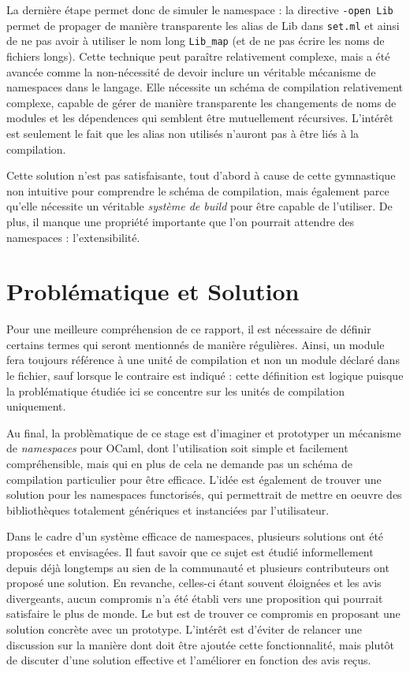 \documentclass[11pt,a4paper]{report}
\begin{document}
La dernière étape permet donc de simuler le namespace : la directive
\texttt{-open Lib} permet de propager de manière transparente les alias de Lib
dans \texttt{set.ml} et ainsi de ne pas avoir à utiliser le nom long
\texttt{Lib\_map} (et de ne pas écrire les noms de fichiers longs). Cette
technique peut paraître relativement complexe, mais a été avancée comme la
non-nécessité de devoir inclure un véritable mécanisme de namespaces dans le
langage. Elle nécessite un schéma de compilation relativement complexe, capable
de gérer de manière transparente les changements de noms de modules et les
dépendences qui semblent être mutuellement récursives. L'intérêt est seulement
le fait que les alias non utilisés n'auront pas à être liés à la compilation.

Cette solution n'est pas satisfaisante, tout d'abord à cause de cette
gymnastique non intuitive pour comprendre le schéma de compilation, mais
également parce qu'elle nécessite un véritable \emph{système de build} pour être
capable de l'utiliser. De plus, il manque une propriété importante que l'on
pourrait attendre des namespaces : l'extensibilité.

\chapter{Problématique et Solution}

Pour une meilleure compréhension de ce rapport, il est nécessaire de définir
certains termes qui seront mentionnés de manière régulières. Ainsi, un module
fera toujours référence à une unité de compilation et non un module déclaré dans
le fichier, sauf lorsque le contraire est indiqué : cette définition est logique
puisque la problématique étudiée ici se concentre sur les unités de compilation
uniquement. 


\medskip

Au final, la problèmatique de ce stage est d'imaginer et prototyper un mécanisme
de \emph{namespaces} pour OCaml, dont l'utilisation soit simple et facilement
compréhensible, mais qui en plus de cela ne demande pas un schéma de compilation
particulier pour être efficace. L'idée est également de trouver une
solution pour les namespaces functorisés, qui permettrait de mettre en oeuvre
des bibliothèques totalement génériques et instanciées par l'utilisateur.

Dans le cadre d'un système efficace de namespaces, plusieurs solutions ont été
proposées et envisagées. Il faut savoir que ce sujet est étudié informellement
depuis déjà longtemps au sien de la communauté et plusieurs contributeurs ont
proposé une solution. En revanche, celles-ci étant souvent éloignées et les avis
divergeants, aucun compromis n'a été établi vers une proposition qui pourrait
satisfaire le plus de monde. Le but est de trouver ce compromis en proposant une
solution concrète avec un prototype. L'intérêt est d'éviter de relancer une
discussion sur la manière dont doit être ajoutée cette fonctionnalité, mais
plutôt de discuter d'une solution effective et l'améliorer en fonction des avis
reçus.
\end{document}
